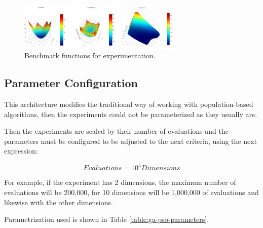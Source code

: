 \documentclass[runningheads]{llncs}
\begin{document}
\begin{figure}[htp]
  \centering
    \includegraphics[width=0.7\textwidth]{img/benchmark.png}
    \caption{Benchmark functions for experimentation.} \label{fig6}
    \end{figure}

\subsection{Parameter Configuration} 

This architecture modifies the traditional way of working with population-based
algorithms, then the experiments could not be parameterized as they
usually are. %

Then the experiments are scaled by their number of evaluations and the
parameters must be configured to be adjusted to the next criteria, using the
next expression: %

\begin{equation}
    \label{eq:hesitancy-interpretation}
   Evaluations = 10^{5} Dimensions
   \end{equation}

For example, if the experiment has 2 dimensions, the maximum number of
   evaluations will be 200,000, for 10 dimensions will be 1,000,000 of evaluations
   and likewise with the other dimensions.


   Parametrization used is shown in Table \ref{table:ga-pso-parameters}.


\end{document}
